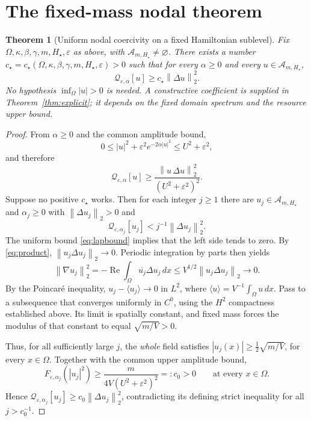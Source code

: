 \documentclass[11pt]{article}
\newtheorem{theorem}{Theorem}[section]
\newcommand{\dd}{\,dx}
\newcommand{\norm}[1]{\left\|#1\right\|}
\begin{document}
\section{The fixed-mass nodal theorem}
\begin{theorem}[Uniform nodal coercivity on a fixed Hamiltonian sublevel]
\label{thm:coercivity}
Fix \(\Omega,\kappa,\beta,\gamma,m,H_\star,\varepsilon\) as above, with
\(\mathcal A_{m,H_\star}\ne\varnothing\). There exists a number
\(c_\star=c_\star(\Omega,\kappa,\beta,\gamma,m,H_\star,\varepsilon)>0\)
such that for \emph{every} \(\alpha\geq0\) and every
\(u\in\mathcal A_{m,H_\star}\),
\begin{equation}
\label{eq:coercive}
\boxed{\qquad
\mathcal Q_{\varepsilon,\alpha}[u]
\geq c_\star\norm{\Delta u}_2^2.\qquad}
\end{equation}
No hypothesis \(\inf_\Omega|u|>0\) is needed.
A constructive coefficient is supplied in
Theorem~\ref{thm:explicit}; it depends on the fixed domain spectrum
and the resource upper bound.
\end{theorem}
\begin{proof}
From \(\alpha\geq0\) and the common amplitude bound,
\[
0\leq|u|^2+\varepsilon^2e^{-2\alpha|u|^2}
\leq U^2+\varepsilon^2,
\]
and therefore
\begin{equation}
\label{eq:product}
\mathcal Q_{\varepsilon,\alpha}[u]\geq
\frac{\norm{u\,\Delta u}_2^2}{(U^2+\varepsilon^2)^2}.
\end{equation}
Suppose no positive \(c_\star\) works. Then for each integer \(j\geq1\)
there are \(u_j\in\mathcal A_{m,H_\star}\) and \(\alpha_j\geq0\)
with \(\norm{\Delta u_j}_2>0\) and
\[
\mathcal Q_{\varepsilon,\alpha_j}[u_j]
<j^{-1}\norm{\Delta u_j}_2^2.
\]
The uniform bound \eqref{eq:lapbound} implies that the left side tends to
zero. By \eqref{eq:product},
\(\norm{u_j\Delta u_j}_2\to0\). Periodic integration by parts then yields
\[
\norm{\nabla u_j}_2^2
=-\operatorname{Re}\int_\Omega\overline{u_j}\Delta u_j\dd
\leq V^{1/2}\norm{u_j\Delta u_j}_2\longrightarrow0.
\]
By the Poincar\'e inequality,
\(u_j-\langle u_j\rangle\to0\) in \(L^2\), where
\(\langle u\rangle=V^{-1}\int_\Omega u\dd\).
Pass to a subsequence that converges uniformly in \(C^0\), using the
\(H^2\) compactness established above. Its limit is spatially constant,
and fixed mass forces the modulus of that constant to equal
\(\sqrt{m/V}>0\).

Thus, for all sufficiently large \(j\), the \emph{whole} field satisfies
\(|u_j(x)|\geq\frac12\sqrt{m/V}\), for every \(x\in\Omega\).
Together with the common upper amplitude bound,
\[
F_{\varepsilon,\alpha_j}(|u_j|^2)
\geq\frac{m}{4V(U^2+\varepsilon^2)^2}
=:c_0>0
\qquad\text{at every }x\in\Omega.
\]
Hence
\(\mathcal Q_{\varepsilon,\alpha_j}[u_j]
\geq c_0\norm{\Delta u_j}_2^2\),
contradicting its defining strict inequality for all \(j>c_0^{-1}\).
\end{proof}
\end{document}
